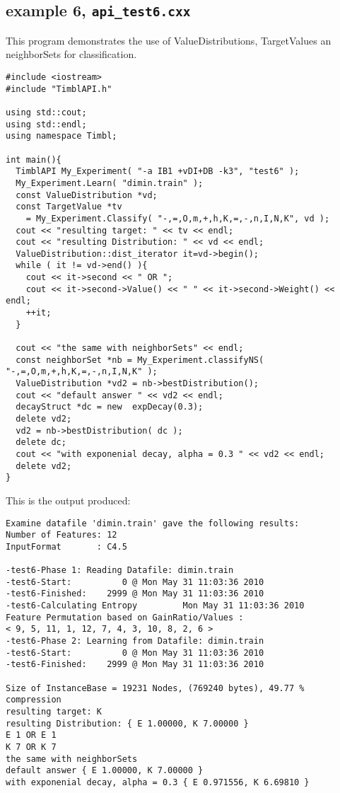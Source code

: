 \documentclass{report}
\begin{document}
\subsection{example 6, {\tt api\_test6.cxx}}

This program demonstrates the use of ValueDistributions, TargetValues
an neighborSets for classification.

\begin{footnotesize}
\begin{verbatim}
#include <iostream>
#include "TimblAPI.h"

using std::cout;
using std::endl;
using namespace Timbl;

int main(){
  TimblAPI My_Experiment( "-a IB1 +vDI+DB -k3", "test6" );
  My_Experiment.Learn( "dimin.train" ); 
  const ValueDistribution *vd;
  const TargetValue *tv
    = My_Experiment.Classify( "-,=,O,m,+,h,K,=,-,n,I,N,K", vd );
  cout << "resulting target: " << tv << endl;
  cout << "resulting Distribution: " << vd << endl;
  ValueDistribution::dist_iterator it=vd->begin();
  while ( it != vd->end() ){
    cout << it->second << " OR ";
    cout << it->second->Value() << " " << it->second->Weight() << endl;
    ++it;
  }

  cout << "the same with neighborSets" << endl;
  const neighborSet *nb = My_Experiment.classifyNS( "-,=,O,m,+,h,K,=,-,n,I,N,K" );
  ValueDistribution *vd2 = nb->bestDistribution();
  cout << "default answer " << vd2 << endl;
  decayStruct *dc = new  expDecay(0.3);
  delete vd2;
  vd2 = nb->bestDistribution( dc );
  delete dc;
  cout << "with exponenial decay, alpha = 0.3 " << vd2 << endl;  
  delete vd2;
}
\end{verbatim}
\end{footnotesize}

This is the output produced:

\begin{footnotesize}
\begin{verbatim}
Examine datafile 'dimin.train' gave the following results:
Number of Features: 12
InputFormat       : C4.5

-test6-Phase 1: Reading Datafile: dimin.train
-test6-Start:          0 @ Mon May 31 11:03:36 2010
-test6-Finished:    2999 @ Mon May 31 11:03:36 2010
-test6-Calculating Entropy         Mon May 31 11:03:36 2010
Feature Permutation based on GainRatio/Values :
< 9, 5, 11, 1, 12, 7, 4, 3, 10, 8, 2, 6 >
-test6-Phase 2: Learning from Datafile: dimin.train
-test6-Start:          0 @ Mon May 31 11:03:36 2010
-test6-Finished:    2999 @ Mon May 31 11:03:36 2010

Size of InstanceBase = 19231 Nodes, (769240 bytes), 49.77 % compression
resulting target: K
resulting Distribution: { E 1.00000, K 7.00000 }
E 1 OR E 1
K 7 OR K 7
the same with neighborSets
default answer { E 1.00000, K 7.00000 }
with exponenial decay, alpha = 0.3 { E 0.971556, K 6.69810 }
\end{verbatim}
\end{footnotesize}
\end{document}
